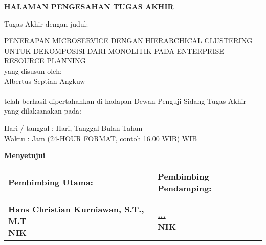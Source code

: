 \vspace*{0cm}

\begin{center}		
	{\large \bfseries HALAMAN PENGESAHAN TUGAS AKHIR \\}
\end{center}
		
\vspace{2cm}

\noindent Tugas Akhir dengan judul:

\noindent PENERAPAN MICROSERVICE DENGAN HIERARCHICAL CLUSTERING UNTUK DEKOMPOSISI DARI MONOLITIK PADA ENTERPRISE RESOURCE PLANNING\\

\noindent yang disusun oleh: \\
\noindent Albertus Septian Angkuw \\
 \\

\noindent telah berhasil dipertahankan di hadapan Dewan Penguji Sidang Tugas Akhir yang dilaksanakan pada: 

\begin{tabs}{3cm}
	\noindent Hari / tanggal \tab : Hari, Tanggal Bulan Tahun \\
	\noindent Waktu \tab : Jam (24-HOUR FORMAT, contoh 16.00 WIB) WIB
\end{tabs}

\vspace{3.2cm}
\begin{center}	
\textbf{Menyetujui} \\
\end{center}

\begin{longtable}{p{6.5cm} p{6.5cm}}
	\centering \textbf{Pembimbing Utama:} &
	\centering \textbf{Pembimbing Pendamping:} \\
	
	\cr \\ \\
		
	\centering \textbf{ \underline{Hans Christian Kurniawan, S.T., M.T} \\ NIK} &
	\centering \textbf{ \underline{...} \\ NIK} \\
	
\end{longtable}